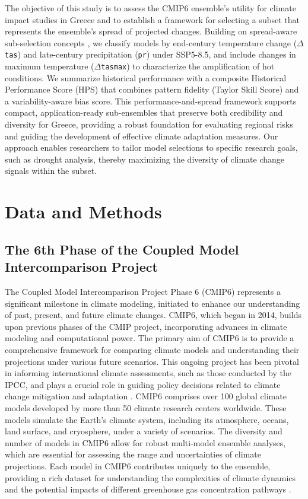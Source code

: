 \documentclass[pdflatex,sn-chicago]{sn-jnl}%
\theoremstyle{thmstyleone}%
\theoremstyle{thmstyletwo}%
\theoremstyle{thmstylethree}%
\begin{document}
The objective of this study is to assess the CMIP6 ensemble's utility for climate impact studies in Greece and to establish a framework for selecting a subset that represents the ensemble’s spread of projected changes. Building on spread-aware sub-selection concepts \citep{Giuntoli2020,Brogli2021}, we classify models by end-century temperature change (\(\Delta\)\texttt{tas}) and late-century precipitation (\texttt{pr}) under SSP5-8.5, and include changes in maximum temperature (\(\Delta\)\texttt{tasmax}) to characterize the amplification of hot conditions. We summarize historical performance with a composite Historical Performance Score (HPS) that combines pattern fidelity (Taylor Skill Score) and a variability-aware bias score. This performance-and-spread framework supports compact, application-ready sub-ensembles that preserve both credibility and diversity for Greece, providing a robust foundation for evaluating regional risks and guiding the development of effective climate adaptation measures. Our approach enables researchers to tailor model selections to specific research goals, such as drought analysis, thereby maximizing the diversity of climate change signals within the subset.



\section{Data and Methods}\label{sec2}
\subsection{The 6th Phase of the Coupled Model Intercomparison Project}
The Coupled Model Intercomparison Project Phase 6 (CMIP6) represents a significant milestone in climate modeling, initiated to enhance our understanding of past, present, and future climate changes. CMIP6, which began in 2014, builds upon previous phases of the CMIP project, incorporating advances in climate modeling and computational power. The primary aim of CMIP6 is to provide a comprehensive framework for comparing climate models and understanding their projections under various future scenarios. This ongoing project has been pivotal in informing international climate assessments, such as those conducted by the IPCC, and plays a crucial role in guiding policy decisions related to climate change mitigation and adaptation \citep{Eyring-2016}. CMIP6 comprises over 100 global climate models developed by more than 50 climate research centers worldwide. These models simulate the Earth's climate system, including its atmosphere, oceans, land surface, and cryosphere, under a variety of scenarios. The diversity and number of models in CMIP6 allow for robust multi-model ensemble analyses, which are essential for assessing the range and uncertainties of climate projections. Each model in CMIP6 contributes uniquely to the ensemble, providing a rich dataset for understanding the complexities of climate dynamics and the potential impacts of different greenhouse gas concentration pathways \citep{Eyring-2016}.
\end{document}
